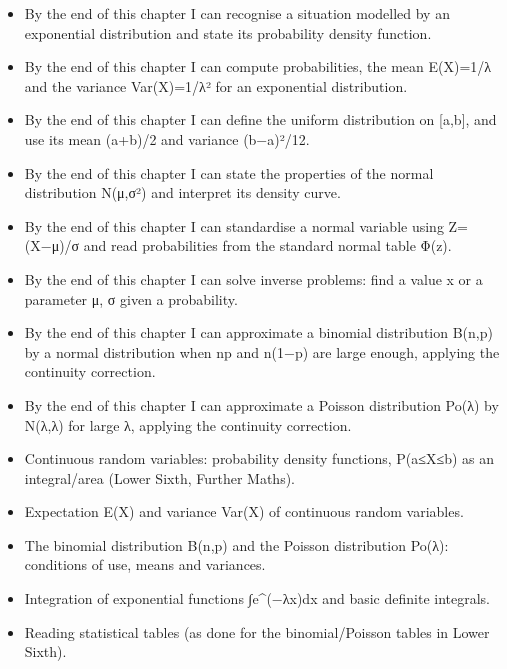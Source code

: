\documentclass[11pt]{article}
\begin{document}
\begin{objectifs}
\begin{itemize}
\item By the end of this chapter I can recognise a situation modelled by an exponential distribution and state its probability density function.
\item By the end of this chapter I can compute probabilities, the mean E(X)=1/λ and the variance Var(X)=1/λ² for an exponential distribution.
\item By the end of this chapter I can define the uniform distribution on [a,b], and use its mean (a+b)/2 and variance (b−a)²/12.
\item By the end of this chapter I can state the properties of the normal distribution N(μ,σ²) and interpret its density curve.
\item By the end of this chapter I can standardise a normal variable using Z=(X−μ)/σ and read probabilities from the standard normal table Φ(z).
\item By the end of this chapter I can solve inverse problems: find a value x or a parameter μ, σ given a probability.
\item By the end of this chapter I can approximate a binomial distribution B(n,p) by a normal distribution when np and n(1−p) are large enough, applying the continuity correction.
\item By the end of this chapter I can approximate a Poisson distribution Po(λ) by N(λ,λ) for large λ, applying the continuity correction.
\end{itemize}
\end{objectifs}

\begin{prerequis}
\begin{itemize}
\item Continuous random variables: probability density functions, P(a≤X≤b) as an integral/area (Lower Sixth, Further Maths).
\item Expectation E(X) and variance Var(X) of continuous random variables.
\item The binomial distribution B(n,p) and the Poisson distribution Po(λ): conditions of use, means and variances.
\item Integration of exponential functions ∫e\^{}(−λx)dx and basic definite integrals.
\item Reading statistical tables (as done for the binomial/Poisson tables in Lower Sixth).
\end{itemize}
\end{prerequis}
\end{document}
